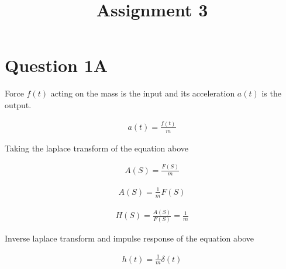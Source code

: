 \documentclass{article}
\begin{document}
\title{Assignment 3}
\maketitle


\section{Question 1A}

Force $f(t)$ acting on the mass is the input and its acceleration $ a(t)$ is the output.

\begin{equation*}
    \begin{aligned}
        a(t) = \frac{f(t)}{m}
    \end{aligned}
\end{equation*}

Taking the laplace transform of the equation above

\begin{equation*}
    \begin{aligned}
        A(S) = \frac{F(S)}{m}
    \end{aligned}
\end{equation*}

\begin{equation*}
    \begin{aligned}
        A(S) = \frac{1}{m} F(S)
    \end{aligned}
\end{equation*}

\begin{equation*}
    \begin{aligned}
        H(S) = \frac{A(S)}{F(S)} = \frac{1}{m}
    \end{aligned}
\end{equation*}

Inverse laplace transform and impulse response of the equation above


\begin{equation*}
    \begin{aligned}
        h(t) = \frac{1}{m} \delta(t)
    \end{aligned}
\end{equation*}
\end{document}
